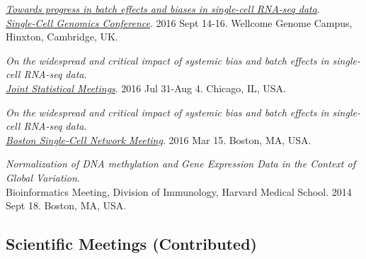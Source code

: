 \documentclass[10pt]{article}
\begin{document}
\item
{\it \href{https://speakerdeck.com/stephaniehicks/towards-progress-in-batch-effects-and-biases-in-single-cell-rna-seq-data}{Towards progress in batch effects and biases in single-cell RNA-seq data}}. \\
\href{https://coursesandconferences.wellcomegenomecampus.org/events/item.aspx?e=596}{{\it Single-Cell Genomics Conference}}. 2016 Sept 14-16. Wellcome Genome Campus, Hinxton, Cambridge, UK.
\item
{\it On the widespread and critical impact of systemic bias and batch effects in single-cell RNA-seq data}. \\
\href{https://www.amstat.org/meetings/jsm/2016/onlineprogram/MainSearchResults.cfm}{{\it Joint Statistical Meetings}}. 2016 Jul 31-Aug 4. Chicago, IL, USA.
\item
{\it On the widespread and critical impact of systemic bias and batch effects in single-cell RNA-seq data}. \\
\href{http://hsci.harvard.edu/event/widespread-and-critical-impact-systemic-bias-and-batch-effects-single-cell-rna-seq-data?delta=0}{{\it Boston Single-Cell Network Meeting}}. 2016 Mar 15. Boston, MA, USA.
\item 
{\it Normalization of DNA methylation and Gene Expression Data in the Context of Global Variation}. \\
Bioinformatics Meeting, Division of Immunology, Harvard Medical School. 2014 Sept 18. Boston, MA, USA.




\subsection*{Scientific Meetings (Contributed)}
\end{document}
